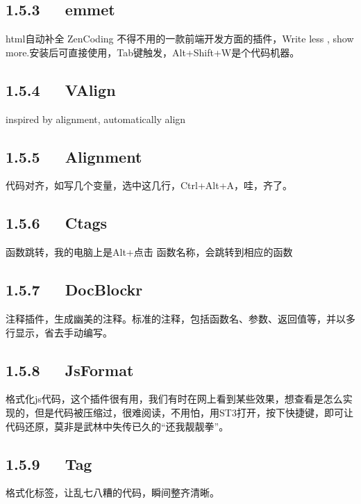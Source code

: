 \documentclass[letterpaper,12pt,english]{sphinxmanual}
\begin{document}
\subsection{1.5.3   emmet}
\label{\detokenize{001software/001install/sublime:emmet}}
\begin{sphinxVerbatim}[commandchars=\\\{\}]
html自动补全
ZenCoding
不得不用的一款前端开发方面的插件，Write less , show more.安装后可直接使用，Tab键触发，Alt+Shift+W是个代码机器。
\end{sphinxVerbatim}


\subsection{1.5.4   VAlign}
\label{\detokenize{001software/001install/sublime:valign}}
inspired by alignment, automatically align


\subsection{1.5.5   Alignment}
\label{\detokenize{001software/001install/sublime:alignment}}
代码对齐，如写几个变量，选中这几行，Ctrl+Alt+A，哇，齐了。


\subsection{1.5.6   Ctags}
\label{\detokenize{001software/001install/sublime:ctags}}
函数跳转，我的电脑上是Alt+点击 函数名称，会跳转到相应的函数


\subsection{1.5.7   DocBlockr}
\label{\detokenize{001software/001install/sublime:docblockr}}
注释插件，生成幽美的注释。标准的注释，包括函数名、参数、返回值等，并以多行显示，省去手动编写。


\subsection{1.5.8   JsFormat}
\label{\detokenize{001software/001install/sublime:jsformat}}
格式化js代码，这个插件很有用，我们有时在网上看到某些效果，想查看是怎么实现的，但是代码被压缩过，很难阅读，不用怕，用ST3打开，按下快捷键，即可让代码还原，莫非是武林中失传已久的“还我靓靓拳”。


\subsection{1.5.9   Tag}
\label{\detokenize{001software/001install/sublime:tag}}
格式化标签，让乱七八糟的代码，瞬间整齐清晰。
\end{document}
